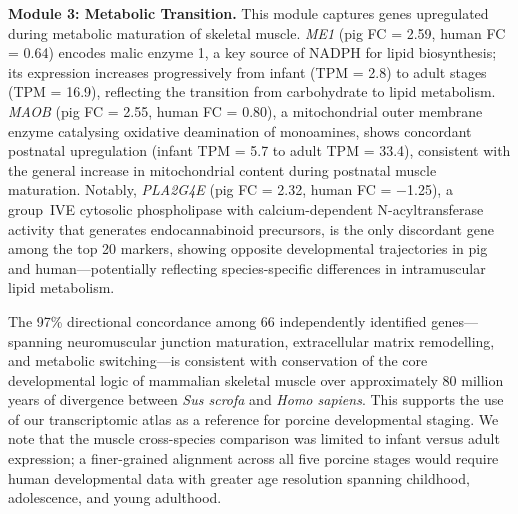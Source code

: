\documentclass[10pt,a4paper]{article}
\begin{document}
\textbf{Module 3: Metabolic Transition.} This module captures genes upregulated during metabolic maturation of skeletal muscle. \textit{ME1} (pig FC = 2.59, human FC = 0.64) encodes malic enzyme 1, a key source of NADPH for lipid biosynthesis\cite{simmen_malic_2020}; its expression increases progressively from infant (TPM = 2.8) to adult stages (TPM = 16.9), reflecting the transition from carbohydrate to lipid metabolism. \textit{MAOB} (pig FC = 2.55, human FC = 0.80), a mitochondrial outer membrane enzyme catalysing oxidative deamination of monoamines, shows concordant postnatal upregulation (infant TPM = 5.7 to adult TPM = 33.4), consistent with the general increase in mitochondrial content during postnatal muscle maturation. Notably, \textit{PLA2G4E} (pig FC = 2.32, human FC = $-$1.25), a group~IVE cytosolic phospholipase with calcium-dependent N-acyltransferase activity that generates endocannabinoid precursors, is the only discordant gene among the top 20 markers, showing opposite developmental trajectories in pig and human---potentially reflecting species-specific differences in intramuscular lipid metabolism.

The 97\% directional concordance among 66 independently identified genes---spanning neuromuscular junction maturation, extracellular matrix remodelling, and metabolic switching---is consistent with conservation of the core developmental logic of mammalian skeletal muscle over approximately 80 million years of divergence between \textit{Sus scrofa} and \textit{Homo sapiens}\cite{kumar_timetree_2022}. This supports the use of our transcriptomic atlas as a reference for porcine developmental staging. We note that the muscle cross-species comparison was limited to infant versus adult expression; a finer-grained alignment across all five porcine stages would require human developmental data with greater age resolution spanning childhood, adolescence, and young adulthood.
\end{document}
